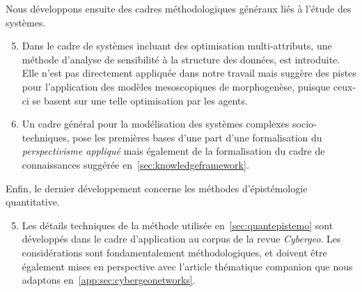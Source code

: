 Nous développons ensuite des cadres méthodologiques généraux liés à l'étude des systèmes.

\begin{enumerate}\setcounter{enumi}{4}
	\item Dans le cadre de systèmes incluant des optimisation multi-attributs, une méthode d'analyse de sensibilité à la structure des données, est introduite. Elle n'est pas directement appliquée dans notre travail mais suggère des pistes pour l'application des modèles mesoscopiques de morphogenèse, puisque ceux-ci se basent sur une telle optimisation par les agents.
	\item Un cadre général pour la modélisation des systèmes complexes socio-techniques, pose les premières bases d'une part d'une formalisation du \emph{perspectivisme appliqué} mais également de la formalisation du cadre de connaissances suggérée en~\ref{sec:knowledgeframework}.
\end{enumerate}

Enfin, le dernier développement concerne les méthodes d'épistémologie quantitative.

\begin{enumerate}\setcounter{enumi}{4}
	\item Les détails techniques de la méthode utilisée en~\ref{sec:quantepistemo} sont développés dans le cadre d'application au corpus de la revue \emph{Cybergeo}. Les considérations sont fondamentalement méthodologiques, et doivent être également mises en perspective avec l'article thématique companion que nous adaptons en~\ref{app:sec:cybergeonetworks}.
\end{enumerate}


\stars

